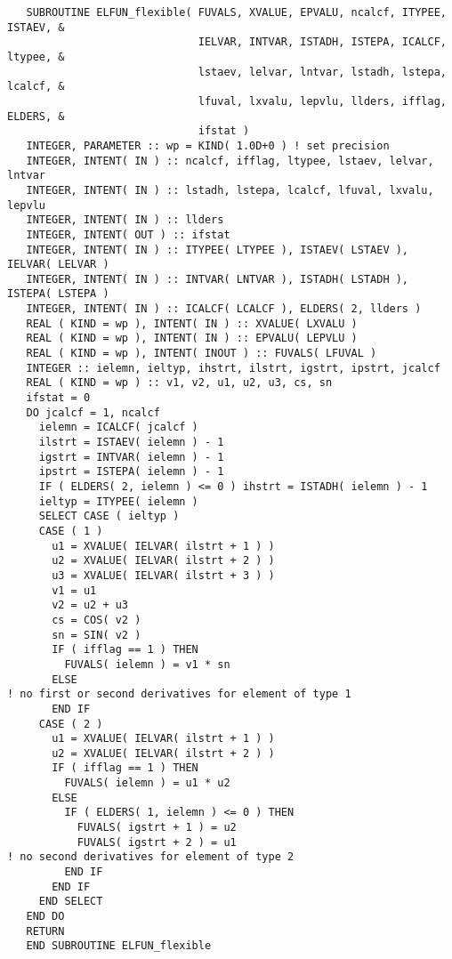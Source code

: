 \documentclass{galahad}
\begin{document}
\def\baselinestretch{0.8}
{%
{\tt \begin{verbatim}
   SUBROUTINE ELFUN_flexible( FUVALS, XVALUE, EPVALU, ncalcf, ITYPEE, ISTAEV, &
                              IELVAR, INTVAR, ISTADH, ISTEPA, ICALCF, ltypee, &
                              lstaev, lelvar, lntvar, lstadh, lstepa, lcalcf, &
                              lfuval, lxvalu, lepvlu, llders, ifflag, ELDERS, &
                              ifstat )
   INTEGER, PARAMETER :: wp = KIND( 1.0D+0 ) ! set precision
   INTEGER, INTENT( IN ) :: ncalcf, ifflag, ltypee, lstaev, lelvar, lntvar
   INTEGER, INTENT( IN ) :: lstadh, lstepa, lcalcf, lfuval, lxvalu, lepvlu
   INTEGER, INTENT( IN ) :: llders
   INTEGER, INTENT( OUT ) :: ifstat
   INTEGER, INTENT( IN ) :: ITYPEE( LTYPEE ), ISTAEV( LSTAEV ), IELVAR( LELVAR )
   INTEGER, INTENT( IN ) :: INTVAR( LNTVAR ), ISTADH( LSTADH ), ISTEPA( LSTEPA )
   INTEGER, INTENT( IN ) :: ICALCF( LCALCF ), ELDERS( 2, llders )
   REAL ( KIND = wp ), INTENT( IN ) :: XVALUE( LXVALU )
   REAL ( KIND = wp ), INTENT( IN ) :: EPVALU( LEPVLU )
   REAL ( KIND = wp ), INTENT( INOUT ) :: FUVALS( LFUVAL )
   INTEGER :: ielemn, ieltyp, ihstrt, ilstrt, igstrt, ipstrt, jcalcf
   REAL ( KIND = wp ) :: v1, v2, u1, u2, u3, cs, sn
   ifstat = 0
   DO jcalcf = 1, ncalcf
     ielemn = ICALCF( jcalcf )
     ilstrt = ISTAEV( ielemn ) - 1
     igstrt = INTVAR( ielemn ) - 1
     ipstrt = ISTEPA( ielemn ) - 1
     IF ( ELDERS( 2, ielemn ) <= 0 ) ihstrt = ISTADH( ielemn ) - 1
     ieltyp = ITYPEE( ielemn )
     SELECT CASE ( ieltyp )
     CASE ( 1 )
       u1 = XVALUE( IELVAR( ilstrt + 1 ) )
       u2 = XVALUE( IELVAR( ilstrt + 2 ) )
       u3 = XVALUE( IELVAR( ilstrt + 3 ) )
       v1 = u1
       v2 = u2 + u3
       cs = COS( v2 )
       sn = SIN( v2 )
       IF ( ifflag == 1 ) THEN
         FUVALS( ielemn ) = v1 * sn
       ELSE
! no first or second derivatives for element of type 1
       END IF
     CASE ( 2 )
       u1 = XVALUE( IELVAR( ilstrt + 1 ) )
       u2 = XVALUE( IELVAR( ilstrt + 2 ) )
       IF ( ifflag == 1 ) THEN
         FUVALS( ielemn ) = u1 * u2
       ELSE
         IF ( ELDERS( 1, ielemn ) <= 0 ) THEN
           FUVALS( igstrt + 1 ) = u2
           FUVALS( igstrt + 2 ) = u1
! no second derivatives for element of type 2
         END IF
       END IF
     END SELECT
   END DO
   RETURN
   END SUBROUTINE ELFUN_flexible
\end{verbatim} } }
\def\baselinestretch{1.0}
\end{document}
